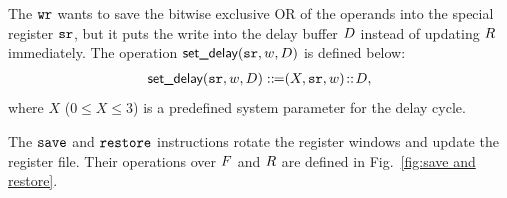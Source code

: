 The $\texttt{wr}$ wants to save the bitwise exclusive OR of
the operands into the special register $\texttt{sr}$, but
it puts the write into the delay buffer $D$
instead of updating $R$ immediately.
The operation $\textsf{set\_delay}(\texttt{sr}, w, D)$
is defined below:
\[
	\begin{array}{l}
		\textsf{set\_delay}(\texttt{sr}, w, D) ::\!\!{=} (X, \texttt{sr}, w)
		\!::\! D, \\
	\end{array}
\]
where $X$ ($0 \leq X \leq 3$) is a
predefined system parameter for the delay cycle.

The $\texttt{save}$ and $\texttt{restore}$ instructions rotate
the register windows and update the register file.
Their operations over $F$ and $R$
are defined in Fig.~\ref{fig:save and restore}.

%
%
%
